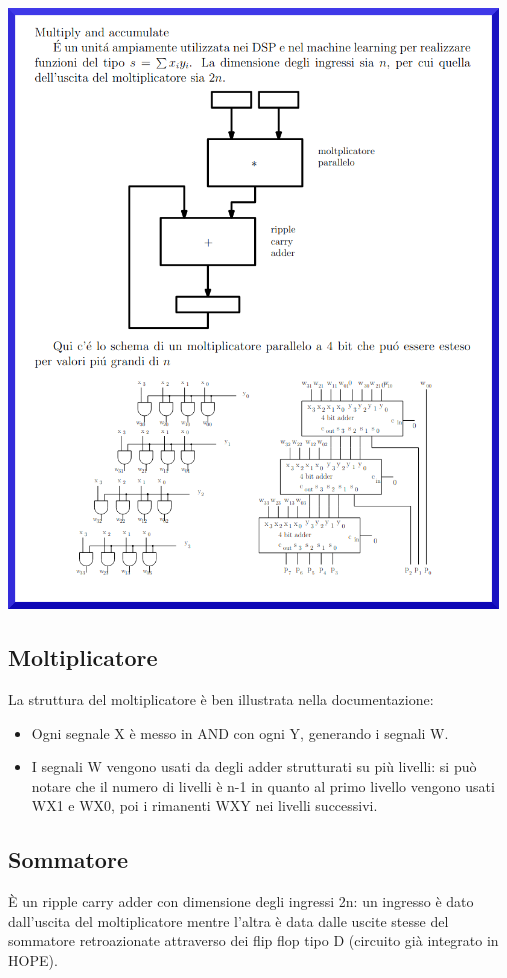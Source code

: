 \documentclass[12pt, letterpaper]{article}
\begin{document}
\includegraphics[width=13cm]{mac.png}

\newpage
\subsection{Moltiplicatore}
La struttura del moltiplicatore è ben illustrata nella documentazione:

\begin{itemize}
  \item Ogni segnale X è messo in AND con ogni Y, generando i segnali W.
  \item I segnali W vengono usati da degli adder strutturati su più livelli: si può notare che il numero di livelli è n-1 in quanto al primo livello vengono usati WX1 e WX0, poi i rimanenti WXY nei livelli successivi.
\end{itemize}

\subsection{Sommatore}
È un ripple carry adder con dimensione degli ingressi 2n: un ingresso è dato dall'uscita del moltiplicatore mentre l'altra è data dalle uscite stesse del sommatore retroazionate attraverso dei flip flop tipo D (circuito già integrato in HOPE).
\end{document}
